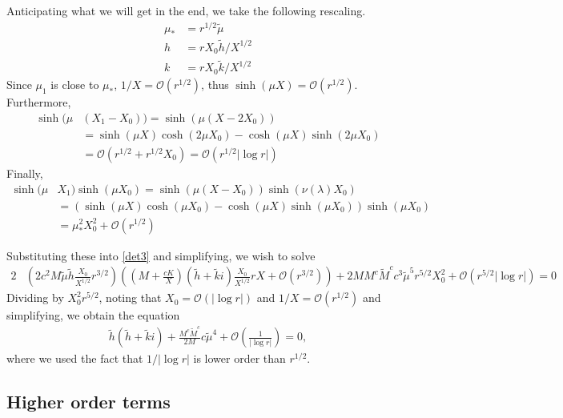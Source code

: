\documentclass[10pt,reqno]{amsart}
\theoremstyle{plain}
\theoremstyle{definition}
\theoremstyle{remark}
\numberwithin{theorem}{section}
\numberwithin{equation}{section}
\begin{document}
Anticipating what we will get in the end, we take the following rescaling.
\begin{align*}
\mu_* &= r^{1/2} \tilde{\mu} \\
h &= r X_0 \tilde{h} / X^{1/2} \\
k &= r X_0 \tilde{k} / X^{1/2}
\end{align*}
Since $\mu_1$ is close to $\mu_*$, $1/X = \mathcal{O}(r^{1/2})$, thus $\sinh(\mu X) =  \mathcal{O}(r^{1/2})$. Furthermore, 
\begin{align*}
\sinh(\mu&(X_1 - X_0)) = \sinh(\mu(X - 2 X_0)) \\
&= \sinh(\mu X) \cosh(2 \mu X_0)  - \cosh(\mu X)\sinh(2 \mu X_0) \\
&= \mathcal{O}\left( r^{1/2} + r^{1/2} X_0 \right) 
= \mathcal{O}\left( r^{1/2}|\log r| \right) 
\end{align*}
Finally, 
\begin{align*}
\sinh(\mu &X_1)\sinh(\mu X_0) = \sinh(\mu ( X - X_0 )) \sinh(\nu(\lambda)X_0) \\
&= \left( \sinh(\mu X) \cosh( \mu X_0)  - \cosh(\mu X)\sinh(\mu X_0) \right)\sinh(\mu X_0) \\
&= \mu_*^2 X_0^2 + \mathcal{O}(r^{1/2})
\end{align*}

Substituting these into \cref{det3} and simplifying, we wish to solve
\begin{equation}\label{det4}
\begin{aligned}
2 &\left( 2 c^2 M \tilde{\mu} \tilde{h} \frac{X_0}{X^{1/2}} r^{3/2} \right) 
\left( \left( M + \frac{c K}{X} \right) ( \tilde{h}+ \tilde{k} i) \frac{X_0}{X^{1/2}} r X + \mathcal{O}(r^{3/2}) \right) 
+ 2 M M^c \tilde{M}^c c^3 \tilde{\mu}^5 r^{5/2} X_0^2 + \mathcal{O}( r^{5/2} |\log r| ) = 0
\end{aligned}
\end{equation}
Dividing by $X_0^2 r^{5/2}$, noting that $X_0 = \mathcal{O}(|\log r|)$ and $1/X = \mathcal{O}(r^{1/2})$ and simplifying, we obtain the equation
\begin{equation}\label{det5}
\begin{aligned}
\tilde{h} ( \tilde{h}+ \tilde{k} i) 
+ \frac{M^c \tilde{M}^c }{2 M} c \tilde{\mu}^4 + \mathcal{O}\left( \frac{1}{|\log r|} \right) = 0,
\end{aligned}
\end{equation}
where we used the fact that $1/|\log r|$ is lower order than $r^{1/2}$. 

\subsection{Higher order terms}
\end{document}
